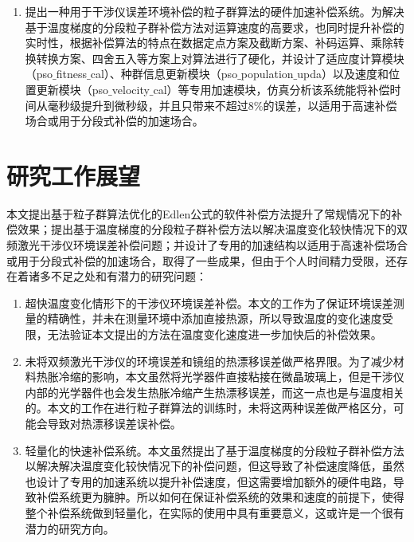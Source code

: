 \begin{enumerate}
    \item 提出一种用于干涉仪误差环境补偿的粒子群算法的硬件加速补偿系统。为解决基于温度梯度的分段粒子群补偿方法对运算速度的高要求，也同时提升补偿的实时性，根据补偿算法的特点在数据定点方案及截断方案、补码运算、乘除转换转换方案、四舍五入等方案上对算法进行了硬化，并设计了适应度计算模块（pso$\_$fitness$\_$cal）、种群信息更新模块（pso$\_$population$\_$upda）以及速度和位置更新模块（pso$\_$velocity$\_$cal）等专用加速模块，仿真分析该系统能将补偿时间从毫秒级提升到微秒级，并且只带来不超过8$\%$的误差，以适用于高速补偿场合或用于分段式补偿的加速场合。
  \end{enumerate}
\section{研究工作展望}
本文提出基于粒子群算法优化的Edlen公式的软件补偿方法提升了常规情况下的补偿效果；提出基于温度梯度的分段粒子群补偿方法以解决温度变化较快情况下的双频激光干涉仪环境误差补偿问题；并设计了专用的加速结构以适用于高速补偿场合或用于分段式补偿的加速场合，取得了一些成果，但由于个人时间精力受限，还存在着诸多不足之处和有潜力的研究问题：
\begin{enumerate}
    \item 超快温度变化情形下的干涉仪环境误差补偿。本文的工作为了保证环境误差测量的精确性，并未在测量环境中添加直接热源，所以导致温度的变化速度受限，无法验证本文提出的方法在温度变化速度进一步加快后的补偿效果。
    \item 未将双频激光干涉仪的环境误差和镜组的热漂移误差做严格界限。为了减少材料热胀冷缩的影响，本文虽然将光学器件直接粘接在微晶玻璃上，但是干涉仪内部的光学器件也会发生热胀冷缩产生热漂移误差，而这一点也是与温度相关的。本文的工作在进行粒子群算法的训练时，未将这两种误差做严格区分，可能会导致对热漂移误差误补偿。
    \item 轻量化的快速补偿系统。本文虽然提出了基于温度梯度的分段粒子群补偿方法以解决解决温度变化较快情况下的补偿问题，但这导致了补偿速度降低，虽然也设计了专用的加速系统以提升补偿速度，但这需要增加额外的硬件电路，导致补偿系统更为臃肿。所以如何在保证补偿系统的效果和速度的前提下，使得整个补偿系统做到轻量化，在实际的使用中具有重要意义，这或许是一个很有潜力的研究方向。
\end{enumerate}

